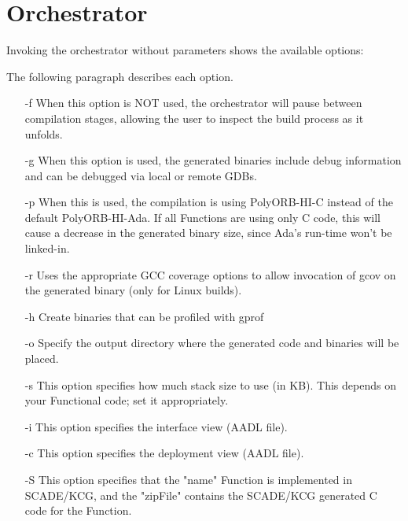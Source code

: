 \documentclass[11pt]{book}
\begin{document}
\section{Orchestrator}
Invoking the orchestrator without parameters shows the available options:



The following paragraph describes each option.

\begin{itemize}

\item[-f] When this option is NOT used, the orchestrator will pause between
compilation stages, allowing the user to inspect the build process as it unfolds.

\item[-g] When this option is used, the generated binaries include debug information
and can be debugged via local or remote GDBs.

\item[-p] When this is used, the compilation is using PolyORB-HI-C instead of the default PolyORB-HI-Ada.
If all Functions are using only C code, this will cause a decrease in the generated binary size,
since Ada's run-time won't be linked-in.

\item[-r] Uses the appropriate GCC coverage options to allow invocation of gcov on the generated binary (only for Linux builds).

\item[-h] Create binaries that can be profiled with gprof

\item[-o] Specify the output directory where the generated code and binaries will be placed.

\item[-s] This option specifies how much stack size to use (in KB). This depends on your Functional code; set it appropriately.

\item[-i] This option specifies the interface view (AADL file).

\item[-c] This option specifies the deployment view (AADL file).

\item[-S] This option specifies that the "name" Function is implemented in SCADE/KCG,
        and the "zipFile" contains the SCADE/KCG generated C code for the Function.


\end{itemize}
\end{document}
